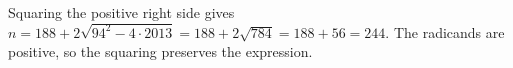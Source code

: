 Squaring the positive right side gives $n=188+2\sqrt{94^2-4\cdot2013}=188+2\sqrt{784}=188+56=\boxed{244}$. The radicands are positive, so the squaring preserves the expression.
